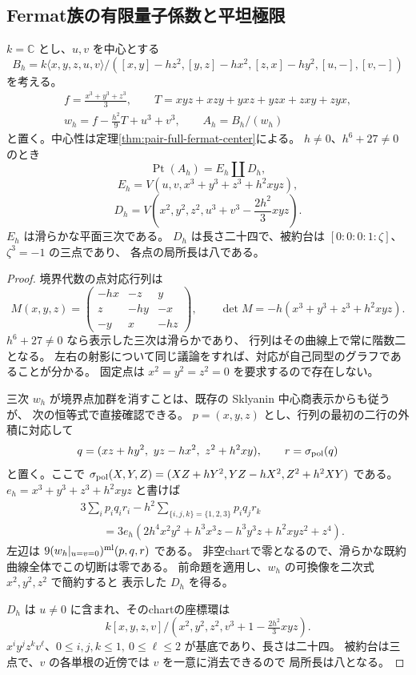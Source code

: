 \subsection{Fermat族の有限量子係数と平坦極限}

\label{subsec:fermat-point-flat-limit}

\begin{proposition}[Fermat点スキームの明示式]
\label{prop:fermat-point-scheme}
$k=\mathbb C$ とし、$u,v$ を中心とする
\[
 B_h=k\langle x,y,z,u,v\rangle/
 ([x,y]-hz^2,[y,z]-hx^2,[z,x]-hy^2,[u,-],[v,-])
\]
を考える。
\[
 \begin{gathered}
 f=\frac{x^3+y^3+z^3}{3},\qquad
 T=xyz+xzy+yxz+yzx+zxy+zyx,\\
 w_h=f-\frac{h^2}{9}T+u^3+v^3,\qquad A_h=B_h/(w_h)
 \end{gathered}
\]
と置く。中心性は定理\ref{thm:pair-full-fermat-center}による。
$h\ne0$、$h^6+27\ne0$のとき
\[
 \operatorname{Pt}(A_h)=E_h\amalg D_h,
\]
\[
 E_h=V(u,v,x^3+y^3+z^3+h^2xyz),
\]
\[
 D_h=V\left(x^2,y^2,z^2,
           u^3+v^3-\frac{2h^2}{3}xyz\right).
\]
$E_h$ は滑らかな平面三次である。
$D_h$ は長さ二十四で、被約台は
$[0:0:0:1:\zeta]$、$\zeta^3=-1$ の三点であり、
各点の局所長は八である。
\end{proposition}

\begin{proof}
境界代数の点対応行列は
\[
 M(x,y,z)=
 \begin{pmatrix}
 -hx&-z&y\\
 z&-hy&-x\\
 -y&x&-hz
 \end{pmatrix},
 \qquad
 \det M=-h(x^3+y^3+z^3+h^2xyz).
\]
$h^6+27\ne0$ なら表示した三次は滑らかであり、
行列はその曲線上で常に階数二となる。
左右の射影について同じ議論をすれば、対応が自己同型のグラフであることが分かる。
固定点は $x^2=y^2=z^2=0$ を要求するので存在しない。

三次 $w_h$ が境界点加群を消すことは、既存の Sklyanin 中心商表示からも従うが、
次の恒等式で直接確認できる。
$p=(x,y,z)$ とし、行列の最初の二行の外積に対応して
\[
 q=(xz+hy^2,\ yz-hx^2,\ z^2+h^2xy),\qquad
 r=\sigma_{\rm pol}(q)
\]
と置く。ここで $\sigma_{\rm pol}(X,Y,Z)=(XZ+hY^2,YZ-hX^2,Z^2+h^2XY)$ である。
$e_h=x^3+y^3+z^3+h^2xyz$ と書けば
\[
\begin{aligned}
 &3\sum_i p_iq_ir_i-h^2\sum_{\{i,j,k\}=\{1,2,3\}}p_iq_jr_k\\
 &\qquad=
 3e_h\left(
 2h^4x^2y^2+h^3x^3z-h^3y^3z+h^2xyz^2+z^4
 \right).
\end{aligned}
\]
左辺は $9(w_h|_{u=v=0})^{\rm ml}(p,q,r)$ である。
非空chartで零となるので、滑らかな既約曲線全体でこの切断は零である。
前命題を適用し、$w_h$ の可換像を二次式 $x^2,y^2,z^2$ で簡約すると
表示した $D_h$ を得る。

$D_h$ は $u\ne0$ に含まれ、そのchartの座標環は
\[
 k[x,y,z,v]/(x^2,y^2,z^2,v^3+1-\tfrac{2h^2}{3}xyz).
\]
$x^iy^jz^kv^\ell$、$0\le i,j,k\le1,\ 0\le\ell\le2$ が基底であり、長さは二十四。
被約台は三点で、$v$ の各単根の近傍では $v$ を一意に消去できるので
局所長は八となる。
\end{proof}

